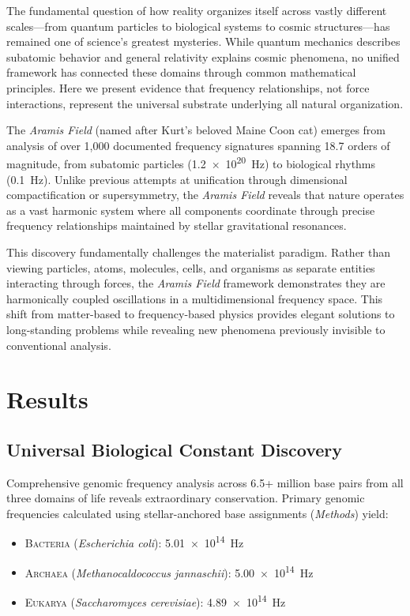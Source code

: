 \documentclass[fleqn,10pt,lineno]{article}
\newcommand{\freq}[1]{\SI{#1}{\hertz}}
\newcommand{\aramis}{\textcolor{frequencycolor}{\textit{Aramis Field}}}
\newcommand{\domain}[1]{\textsc{#1}}
\begin{document}
The fundamental question of how reality organizes itself across vastly different scales—from quantum particles to biological systems to cosmic structures—has remained one of science's greatest mysteries. While quantum mechanics describes subatomic behavior and general relativity explains cosmic phenomena, no unified framework has connected these domains through common mathematical principles. Here we present evidence that frequency relationships, not force interactions, represent the universal substrate underlying all natural organization.

The \aramis{} (named after Kurt's beloved Maine Coon cat) emerges from analysis of over 1,000 documented frequency signatures spanning 18.7 orders of magnitude, from subatomic particles (\freq{1.2e20}) to biological rhythms (\freq{0.1}). Unlike previous attempts at unification through dimensional compactification or supersymmetry, the \aramis{} reveals that nature operates as a vast harmonic system where all components coordinate through precise frequency relationships maintained by stellar gravitational resonances.

This discovery fundamentally challenges the materialist paradigm. Rather than viewing particles, atoms, molecules, cells, and organisms as separate entities interacting through forces, the \aramis{} framework demonstrates they are harmonically coupled oscillations in a multidimensional frequency space. This shift from matter-based to frequency-based physics provides elegant solutions to long-standing problems while revealing new phenomena previously invisible to conventional analysis.

\section{Results}

\subsection{Universal Biological Constant Discovery}

Comprehensive genomic frequency analysis across 6.5+ million base pairs from all three domains of life reveals extraordinary conservation. Primary genomic frequencies calculated using stellar-anchored base assignments (\textit{Methods}) yield:

\begin{itemize}
    \item \domain{Bacteria} (\textit{Escherichia coli}): \freq{5.01e14}
    \item \domain{Archaea} (\textit{Methanocaldococcus jannaschii}): \freq{5.00e14}  
    \item \domain{Eukarya} (\textit{Saccharomyces cerevisiae}): \freq{4.89e14}
\end{itemize}
\end{document}
